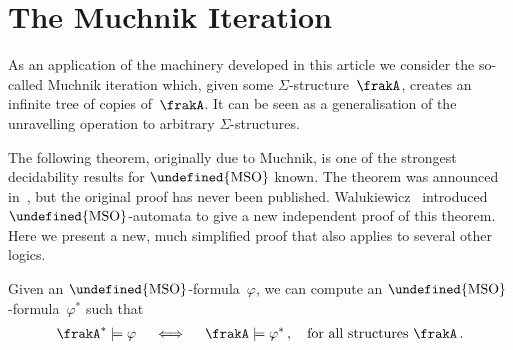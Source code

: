 \documentclass[10pt, fleqn]{scrartcl}
\makeatletter
\newcommand\m@thsm@ller[2]{\mbox{\relscale{0.91}$\m@th#1#2$}}
\let\smaller\undefined
\DeclareRobustCommand\smaller[1]{\relax\ifmmode{\mathpalette\m@thsm@ller{#1}}\else{\relscale{0.91}#1}\fi}
\newcommand*{\suc}{\mathrm{suc}}
\newcommand*{\cl}{\mathrm{cl}}
\newcommand*{\MSO}{\smaller{\mathrm{MSO}}}
\newcommand*{\?}{\kern .08em}
\newcommand\upqed{\vskip-\baselineskip\vskip-\belowdisplayskip}
\makeatother
\begin{document}
\section{The Muchnik Iteration}   %
\label{Sect: Muchnik}


As an application of the machinery developed in this article we consider the so-called
Muchnik iteration which, given some $\Sigma$-structure~$\frakA$, creates an infinite tree
of copies of~$\frakA$. It can be seen as a generalisation of the unravelling operation
to arbitrary $\Sigma$-structures.

The following theorem, originally due to Muchnik, is one of the strongest decidability results
for $\MSO$ known. The theorem was announced in~\cite{Semenov84}, but the original proof
has never been published. Walukiewicz~\cite{Walukiewicz02} introduced $\MSO$-automata
to give a new independent proof of this theorem.
Here we present a new, much simplified proof that also applies to several other logics.
\begin{Thm}\label{Thm: Muchnik}
Given an\/ $\MSO$-formula~$\varphi$, we can compute an\/ $\MSO$-formula~$\varphi^*$ such that
\begin{align*}
  \frakA^* \models \varphi \quad\iff\quad \frakA \models \varphi^*\,,
  \quad\text{for all structures } \frakA\,.
\end{align*}
\end{Thm}
\end{document}
